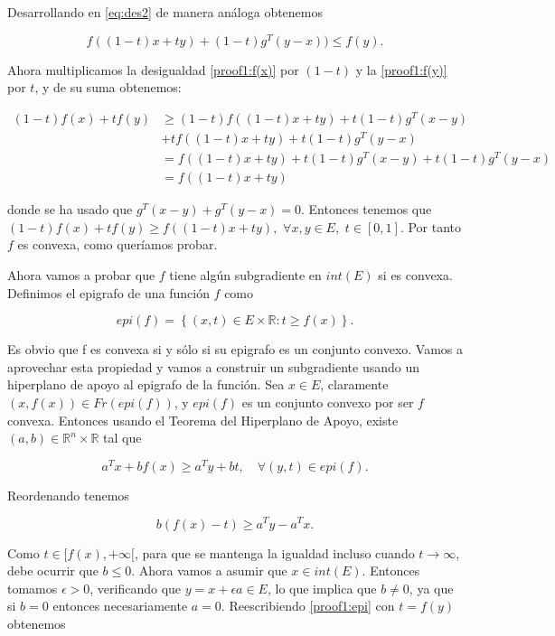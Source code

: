 Desarrollando en \eqref{eq:des2} de manera análoga obtenemos

\begin{equation}\label{proof1:f(y)}
    f((1-t)x + ty) + (1-t)g^T(y-x)) \leq f(y).
\end{equation}

Ahora multiplicamos la desigualdad \eqref{proof1:f(x)} por $(1-t)$ y la \eqref{proof1:f(y)} por $t$, y de su suma obtenemos:

\begin{align*}
	(1-t)f(x) + tf(y) &\geq  (1-t)f((1-t)x+ty) + t(1-t)g^T(x-y) \\
	&+ tf((1-t)x+ty) + t(1-t)g^T(y-x) \\
	 &= f((1-t)x + ty) + t(1-t) g^T(x-y) + t(1-t)g^T(y-x) \\
	&= f((1-t)x+ty)
\end{align*}

donde se ha usado que $g^T(x-y) + g^T(y-x)=0$. Entonces tenemos que $(1-t)f(x) + tf(y) \geq f((1-t)x + ty), $ $ \forall x,y \in E, $ $ t \in [0,1]$. Por tanto $f$ es convexa, como queríamos probar.

Ahora vamos a probar que $f$ tiene algún subgradiente en $int(E)$ si es convexa. Definimos el epigrafo de una función $f$ como

 $$epi(f)=\left \{ (x,t) \in E \times \mathbb{R} : t \geq f(x) \right \}.$$

Es obvio que f es convexa si y sólo si su epigrafo es un conjunto convexo. Vamos a aprovechar esta propiedad y vamos a construir un subgradiente usando un hiperplano de apoyo al epigrafo de la función. Sea $x \in E$, claramente $(x, f(x)) \in Fr(epi(f))$, y $epi(f)$ es un conjunto convexo por ser $f$ convexa. Entonces usando el Teorema del Hiperplano de Apoyo, existe $(a,b) \in \mathbb{R}^n \times \mathbb{R}$ tal que

\begin{equation}\label{proof1:epi}
    a^Tx + bf(x) \geq a^Ty + bt, \quad \forall (y,t) \in epi(f).
\end{equation}

Reordenando tenemos

$$b(f(x)-t) \geq a^Ty - a^Tx.$$

Como $t \in [f(x), + \infty [$, para que se mantenga la igualdad incluso cuando $t \rightarrow \infty$, debe ocurrir que $b\leq 0$. Ahora vamos a asumir que $x \in int(E)$. Entonces tomamos $\epsilon > 0$, verificando que $y=x+\epsilon a \in E$, lo que implica que $b\neq 0$, ya que si $b=0$ entonces necesariamente $a=0$. Reescribiendo \eqref{proof1:epi} con $t=f(y)$ obtenemos

